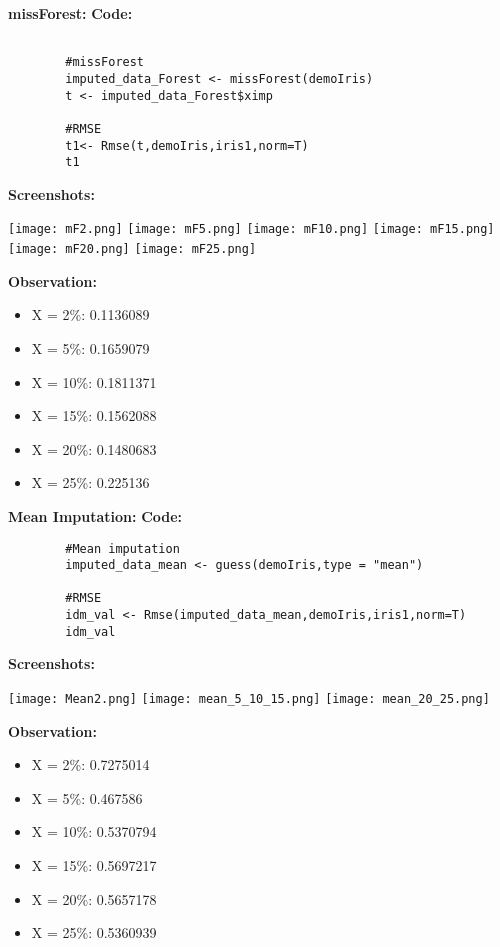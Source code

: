 \documentclass{article}
\begin{document}
\textbf{missForest:}\newline\newline
\textbf{Code:}
	\begin{lstlisting}
	
		#missForest
		imputed_data_Forest <- missForest(demoIris)
		t <- imputed_data_Forest$ximp
		
		#RMSE
		t1<- Rmse(t,demoIris,iris1,norm=T)
		t1
	\end{lstlisting}
\textbf{Screenshots:}
\begin{center}
	\texttt{[image: mF2.png]}
	\texttt{[image: mF5.png]}
	\texttt{[image: mF10.png]}
	\texttt{[image: mF15.png]}
	\texttt{[image: mF20.png]}
	\texttt{[image: mF25.png]}
\end{center}
\textbf{Observation:}
	\begin{itemize}
	\item X = 2\%: 0.1136089
	\item X = 5\%: 0.1659079
	\item X = 10\%: 0.1811371
	\item X = 15\%: 0.1562088
	\item X = 20\%: 0.1480683
	\item X = 25\%: 0.225136
	
	\end{itemize}

\textbf{Mean Imputation:}\newline\newline
\textbf{Code:}
	\begin{lstlisting}
		#Mean imputation
		imputed_data_mean <- guess(demoIris,type = "mean")
		
		#RMSE
		idm_val <- Rmse(imputed_data_mean,demoIris,iris1,norm=T)
		idm_val
	\end{lstlisting}
\textbf{Screenshots:}
\begin{center}
	\texttt{[image: Mean2.png]}
	\texttt{[image: mean\_5\_10\_15.png]}
	\texttt{[image: mean\_20\_25.png]}
\end{center}
\textbf{Observation:}

	\begin{itemize}
	\item X = 2\%: 0.7275014
	\item X = 5\%: 0.467586
	\item X = 10\%: 0.5370794
	\item X = 15\%: 0.5697217
	\item X = 20\%: 0.5657178
	\item X = 25\%: 0.5360939

	
	\end{itemize}
\end{document}
